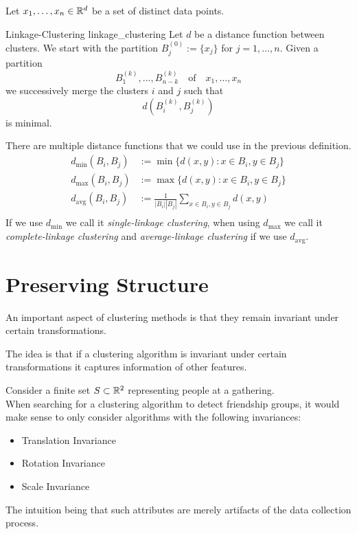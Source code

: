 Let $x_1, \dots, x_n \in \mathbb R^d$ be a set of distinct data points.
\begin{definition}{Linkage-Clustering }{linkage_clustering}
Let $d$ be a distance function between clusters. We start with the partition $B^{(0)}_j := \{x_j\}$ for $j = 1, \dots, n$.
Given a partition
$$
B^{(k)}_1, \dots, B^{(k)}_{n - k} \quad \text{of} \quad x_1, \dots, x_n
$$
we successively merge the clusters $i$ and $j$ such that
$$
d(B^{(k)}_i,B^{(k)}_j)
$$
is minimal.
\end{definition}

There are multiple distance functions that we could use in the previous definition.
\begin{align*}
d_\mathrm{min} (B_i, B_j) &:= \min\{d(x,y): x \in B_i, y \in B_j\}\\
d_\mathrm{max} (B_i, B_j) &:= \max\{d(x,y): x \in B_i, y \in B_j\}\\
d_\mathrm{avg}(B_i,B_j) &:= \frac{1}{|B_i||B_j|} \sum_{x \in B_i, y \in B_j} d(x,y)\\
\end{align*}
If we use $d_\mathrm{min}$ we call it \emph{single-linkage clustering}, when using $d_\mathrm{max}$ we call it \emph{complete-linkage clustering} and \emph{average-linkage clustering} if we use $d_\mathrm{avg}$.

\section{Preserving Structure}
\label{seciton__preserving_structure}
An important aspect of clustering methods is that they remain invariant under certain transformations.

The idea is that if a clustering algorithm is invariant under certain transformations it captures information of other features.

\begin{example}{}{}
Consider a finite set $S \subset \mathbb R^2$ representing people at a gathering.\\

When searching for a clustering algorithm to detect friendship groups, it would make sense to only consider algorithms with the following invariances:
\begin{itemize}
    \item Translation Invariance
    \item Rotation Invariance
    \item Scale Invariance
\end{itemize}
The intuition being that such attributes are merely artifacts of the data collection process.
\end{example}

